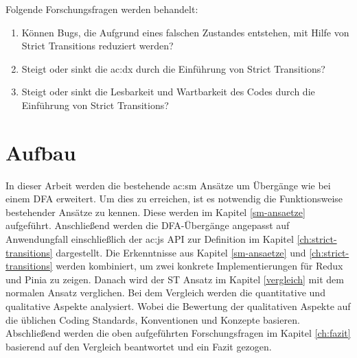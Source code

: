 Folgende Forschungsfragen werden behandelt:

\begin{enumerate}
  \item Können Bugs, die Aufgrund eines falschen Zustandes entstehen, mit Hilfe von Strict Transitions reduziert werden?
  \item Steigt oder sinkt die \acrshort{ac:dx} durch die Einführung von Strict Transitions?
  \item Steigt oder sinkt die Lesbarkeit und Wartbarkeit des Codes durch die Einführung von Strict Transitions?
\end{enumerate}

\section{Aufbau}

In dieser Arbeit werden die bestehende \acrshort{ac:sm} Ansätze um Übergänge wie bei einem DFA erweitert. Um dies zu erreichen, ist es notwendig die Funktionsweise bestehender Ansätze zu kennen. Diese werden im Kapitel \ref{sm-ansaetze} aufgeführt. Anschließend werden die DFA-Übergänge angepasst auf Anwendungfall einschließlich der \acrlong{ac:js} API zur Definition im Kapitel \ref{ch:strict-transitions} dargestellt. Die Erkenntnisse aus Kapitel \ref{sm-ansaetze} und \ref{ch:strict-transitions} werden kombiniert, um zwei konkrete Implementierungen für Redux und Pinia zu zeigen. Danach wird der ST Ansatz im Kapitel \ref{vergleich} mit dem normalen Ansatz verglichen. Bei dem Vergleich werden die quantitative und qualitative Aspekte analysiert. Wobei die Bewertung der qualitativen Aspekte auf die üblichen Coding Standards, Konventionen und Konzepte basieren. Abschließend werden die oben aufgeführten Forschungsfragen im Kapitel \ref{ch:fazit} basierend auf den Vergleich beantwortet und ein Fazit gezogen.

